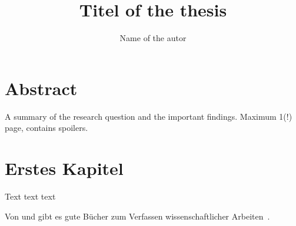 \documentclass[doctype=mastersthesis,lang=english,BCOR=15mm,biblatex]{ldvbook}
\begin{document}
\title{Titel of the thesis}
\author{Name of the autor}


\maketitle[frontcover=Design1]


\chapter*{Abstract}

A summary of the research question and the important findings.
Maximum 1(!) page, contains spoilers.


\tableofcontents






\chapter{Erstes Kapitel}

Text text text

Von \textcite[deutsch]{Niederhauser2006} und
\textcite[englisch]{Gustavii2003} gibt es gute Bücher zum Verfassen
wissenschaftlicher Arbeiten~\cite{Gustavii2003}.


\printbibliography{}
\end{document}
